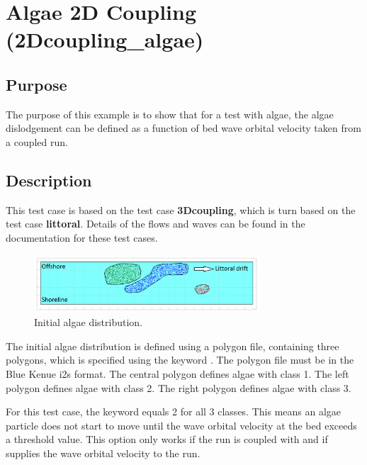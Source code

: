 \chapter{Algae 2D Coupling (2Dcoupling\_algae)}

\section{Purpose}

The purpose of this example is to show that for a test with algae, the algae
dislodgement can be defined as a function of bed wave orbital velocity taken
from a coupled \tomawac run.

\section{Description}

This test case is based on the \tomawac test case \textbf{3Dcoupling},
which is turn based on the \gaia test case \textbf{littoral}.
Details of the flows and waves can be found in the documentation for these test
cases.

\begin{figure}[h]%
  \begin{center}
    \includegraphics[width=0.75\textwidth]{./img/2Dcouple_initial_02}
  \end{center}
  \caption{Initial algae distribution.}
  \label{fig:exp2d_init}
\end{figure}

The initial algae distribution is defined using a polygon file, containing three
polygons, which is specified using the keyword
.
The polygon file must be in the Blue Kenue i2s format.
The central polygon defines algae with class 1.
The left polygon defines algae with class 2.
The right polygon defines algae with class 3.

\smallskip
For this test case, the keyword  equals 2 for all 3
classes.
This means an algae particle does not start to move until the wave orbital
velocity at the bed exceeds a threshold value.
This option only works if the  run is coupled with \tomawac and if
\tomawac supplies the wave orbital velocity to the  run.

